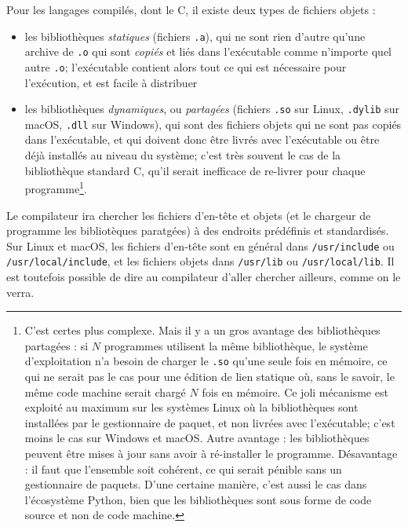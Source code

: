 \documentclass{book}
\newcommand{\cpp}{\mbox{C\vspace{.5em}\protect\raisebox{.2ex}{\footnotesize++~}}}
\def\filename{\texttt}
\begin{document}
Pour les langages compilés, dont le \cpp, il existe deux types de fichiers objets :
\begin{itemize}
  \item les bibliothèques \emph{statiques} (fichiers \texttt{.a}), qui ne sont rien d'autre qu'une archive de \texttt{.o} qui sont \emph{copiés} et liés dans l'exécutable comme n'importe quel autre \texttt{.o}; l'exécutable contient alors tout ce qui est nécessaire pour l'exécution, et est facile à distribuer
  \item les bibliothèques \emph{dynamiques}, ou \emph{partagées} (fichiers \texttt{.so} sur Linux, \texttt{.dylib} sur macOS, \texttt{.dll} sur Windows), qui sont des fichiers objets qui ne sont pas copiés dans l'exécutable, et qui doivent donc être livrés avec l'exécutable ou être déjà installés au niveau du système; c'est très souvent le cas de la bibliothèque standard \cpp, qu'il serait inefficace de re-livrer pour chaque programme\footnote{C'est certes plus complexe. Mais il y a un gros avantage des bibliothèques partagées : si $N$ programmes utilisent la même bibliothèque, le système d'exploitation n'a besoin de charger le \texttt{.so} qu'une seule fois en mémoire, ce qui ne serait pas le cas pour une édition de lien statique où, sans le savoir, le même code machine serait chargé $N$ fois en mémoire. Ce joli mécanisme est exploité au maximum sur les systèmes Linux où la bibliothèques sont installées par le gestionnaire de paquet, et non livrées avec l'exécutable; c'est moins le cas sur Windows et macOS. Autre avantage : les bibliothèques peuvent être mises à jour sans avoir à ré-installer le programme. Désavantage : il faut que l'ensemble soit cohérent, ce qui serait pénible sans un gestionnaire de paquets. D'une certaine manière, c'est aussi le cas dans l'écosystème Python, bien que les bibliothèques sont sous forme de code source et non de code machine.}.
\end{itemize}
Le compilateur ira chercher les fichiers d'en-tête et objets (et le chargeur de programme les bibliotèques paratgées) à des endroits prédéfinis et standardisés. Sur Linux et macOS, les fichiers d'en-tête sont en général dans \filename{/usr/include} ou \filename{/usr/local/include}, et les fichiers objets dans \filename{/usr/lib} ou \filename{/usr/local/lib}. Il est toutefois possible de dire au compilateur d'aller chercher ailleurs, comme on le verra.

\vspace{1em}
\end{document}
